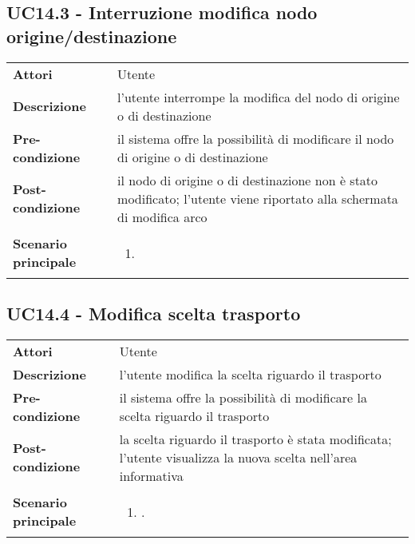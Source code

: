\subsection{UC14.3 - Interruzione modifica nodo origine/destinazione} 
\label{sssec:UC14.3} 
\def\arraystretch{1.5}
\begin{tabularx}{\textwidth}{l|p{}}
	\rowcolor{I} \multicolumn{2}{c}{\color{white}\textbf{UC14.3 - Interruzione modifica nodo origine/destinazione}} \\
	\toprule
	\endhead
	\textbf{Attori} & Utente\\
	\textbf{Descrizione} & l'utente interrompe la modifica del nodo di origine o di destinazione\\
	\textbf{Pre-condizione} & il sistema offre la possibilità di modificare il nodo di origine o di destinazione\\
	\textbf{Post-condizione} & il nodo di origine o di destinazione non è stato modificato; l'utente viene riportato alla schermata di modifica arco\\
	\textbf{Scenario principale} & \vspace{-1.2em}\begin{enumerate}[leftmargin=*,noitemsep,nosep]
		\item \nameref{sssec:UC14.3}
	\end{enumerate}\\
	\bottomrule
\end{tabularx}
\subsection{UC14.4 - Modifica scelta trasporto} 
\label{sssec:UC14.4} 
\def\arraystretch{1.5}
\begin{tabularx}{\textwidth}{l|p{}}
	\rowcolor{I} \multicolumn{2}{c}{\color{white}\textbf{UC14.4 - Modifica scelta trasporto}} \\
	\toprule
	\endhead
	\textbf{Attori} & Utente\\
	\textbf{Descrizione} & l'utente modifica la scelta riguardo il trasporto\\
	\textbf{Pre-condizione} & il sistema offre la possibilità di modificare la scelta riguardo il trasporto\\
	\textbf{Post-condizione} & la scelta riguardo il trasporto è stata modificata; l'utente visualizza la nuova scelta nell'area informativa\\
	\textbf{Scenario principale} & \vspace{-1.2em}\begin{enumerate}[leftmargin=*,noitemsep,nosep]
		\item \nameref{sssec:UC14.4}.
	\end{enumerate}\\
	\bottomrule
\end{tabularx}
